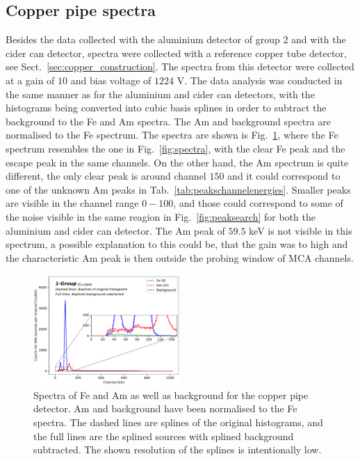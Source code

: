 \subsection{Copper pipe spectra}

Besides the data collected with the aluminium detector of group 2 and with the cider can detector, spectra were collected with a reference copper tube detector, see Sect.~\ref{sec:copper_construction}. The spectra from this detector were collected at a gain of $10$ and bias voltage of $1224$ V. The data analysis was conducted in the same manner as for the aluminium and cider can detectors, with the histograms being converted into cubic basis splines in order to subtract the background to the Fe and Am spectra. The Am and background spectra are normalised to the Fe spectrum. The spectra are shown is Fig.~\ref{fig:copperpipepeaks}, where the Fe spectrum resembles the one in Fig.~\ref{fig:spectra}, with the clear Fe peak and the escape peak in the same channels. On the other hand, the Am spectrum is quite different, the only clear peak is around channel $150$ and it could correspond to one of the unknown Am peaks in Tab.~\ref{tab:peakschannelenergies}. Smaller peaks are visible in the channel range $0-100$, and those could correspond to some of the noise visible in the same reagion in Fig.~\ref{fig:peaksearch} for both the aluminium and cider can detector. The Am peak of $59.5$ keV is not visible in this spectrum, a possible explanation to this could be, that the gain was to high and the characteristic Am peak is then outside the probing window of MCA channels. 

\begin{figure}[htbp]
  \includegraphics[width=0.5\textwidth]{graphics/cupbkgsubtraction.pdf}
  \caption{Spectra of Fe and Am as well as background for the copper pipe detector. Am and background have been normalised to the Fe spectra. The dashed lines are splines of the original histograms, and the full lines are the splined sources with splined background subtracted. The shown resolution of the splines is intentionally low.}
  \label{fig:copperpipepeaks}
\end{figure}
